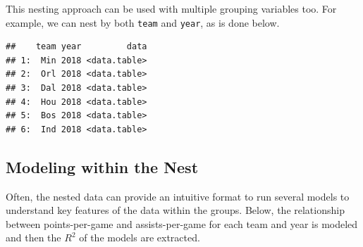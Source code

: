 \documentclass[doc]{apa6}
\newenvironment{Shaded}{\begin{snugshade}}{\end{snugshade}}
\newcommand{\DataTypeTok}[1]{\textcolor[rgb]{0.13,0.29,0.53}{#1}}
\newcommand{\DecValTok}[1]{\textcolor[rgb]{0.00,0.00,0.81}{#1}}
\newcommand{\ErrorTok}[1]{\textcolor[rgb]{0.64,0.00,0.00}{\textbf{#1}}}
\newcommand{\KeywordTok}[1]{\textcolor[rgb]{0.13,0.29,0.53}{\textbf{#1}}}
\newcommand{\NormalTok}[1]{#1}
\newcommand{\OperatorTok}[1]{\textcolor[rgb]{0.81,0.36,0.00}{\textbf{#1}}}
\newcommand{\StringTok}[1]{\textcolor[rgb]{0.31,0.60,0.02}{#1}}
\begin{document}
This nesting approach can be used with multiple grouping variables too. For example, we can nest by both \texttt{team} and \texttt{year}, as is done below.

\begin{Shaded}
\end{Shaded}

\begin{verbatim}
##    team year         data
## 1:  Min 2018 <data.table>
## 2:  Orl 2018 <data.table>
## 3:  Dal 2018 <data.table>
## 4:  Hou 2018 <data.table>
## 5:  Bos 2018 <data.table>
## 6:  Ind 2018 <data.table>
\end{verbatim}

\hypertarget{modeling-within-the-nest}{%
\subsection{Modeling within the Nest}\label{modeling-within-the-nest}}

Often, the nested data can provide an intuitive format to run several models to understand key features of the data within the groups. Below, the relationship between points-per-game and assists-per-game for each team and year is modeled and then the \(R^2\) of the models are extracted.

\begin{Shaded}
\end{Shaded}
\end{document}
